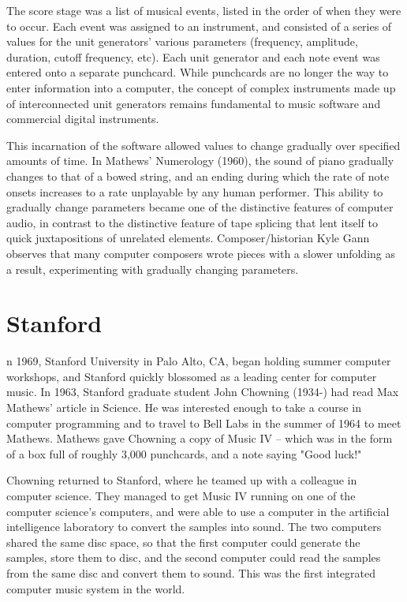 The score stage was a list of musical events, listed in the order of when they were to occur. Each event was assigned to an instrument, and consisted of a series of values for the unit generators' various parameters (frequency, amplitude, duration, cutoff frequency, etc). Each unit generator and each note event was entered onto a separate punchcard. While punchcards are no longer the way to enter information into a computer, the concept of complex instruments made up of interconnected unit generators remains fundamental to music software and commercial digital instruments.

This incarnation of the software allowed values to change gradually over specified amounts of time. In Mathews' Numerology (1960), the sound of piano gradually changes to that of a bowed string, and an ending during which the rate of note onsets increases to a rate unplayable by any human performer. This ability to gradually change parameters became one of the distinctive features of computer audio, in contrast to the distinctive feature of tape splicing that lent itself to quick juxtapositions of unrelated elements. Composer/historian Kyle Gann observes that many computer composers wrote pieces with a slower unfolding as a result, experimenting with gradually changing parameters.

\section{Stanford}
n 1969, Stanford University in Palo Alto, CA, began holding summer computer workshops, and Stanford quickly blossomed as a leading center for computer music. In 1963, Stanford graduate student John Chowning (1934-) had read Max Mathews' article in Science. He was interested enough to take a course in computer programming and to travel to Bell Labs in the summer of 1964 to meet Mathews. Mathews gave Chowning a copy of Music IV -- which was in the form of a box full of roughly 3,000 punchcards, and a note saying "Good luck!"

Chowning returned to Stanford, where he teamed up with a colleague in computer science. They managed to get Music IV running on one of the computer science's computers, and were able to use a computer in the artificial intelligence laboratory to convert the samples into sound. The two computers shared the same disc space, so that the first computer could generate the samples, store them to disc, and the second computer could read the samples from the same disc and convert them to sound. This was the first integrated computer music system in the world.

